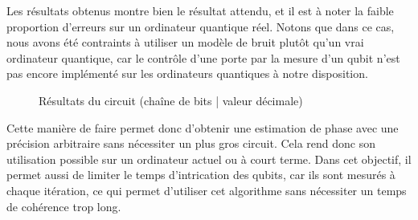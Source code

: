 Les résultats obtenus montre bien le résultat attendu, et il est à noter la faible
proportion d'erreurs sur un ordinateur quantique réel.
Notons que dans ce cas, nous avons été contraints à utiliser un modèle de bruit plutôt qu'un
vrai ordinateur quantique, car le contrôle d'une porte par la mesure d'un qubit n'est pas
encore implémenté sur les ordinateurs quantiques à notre disposition.
\begin{figure}[H]
    \centering
    \caption{Résultats du circuit (chaîne de bits | valeur décimale)}
    \label{fig:ipe-res}
\end{figure}
Cette manière de faire permet donc d'obtenir une estimation de phase avec une précision
arbitraire sans nécessiter un plus gros circuit.
Cela rend donc son utilisation possible sur un ordinateur actuel ou à court terme.
Dans cet objectif, il permet aussi de limiter le temps d'intrication des qubits, car ils
sont mesurés à chaque itération, ce qui permet d'utiliser cet algorithme sans nécessiter un temps
de cohérence trop long.

